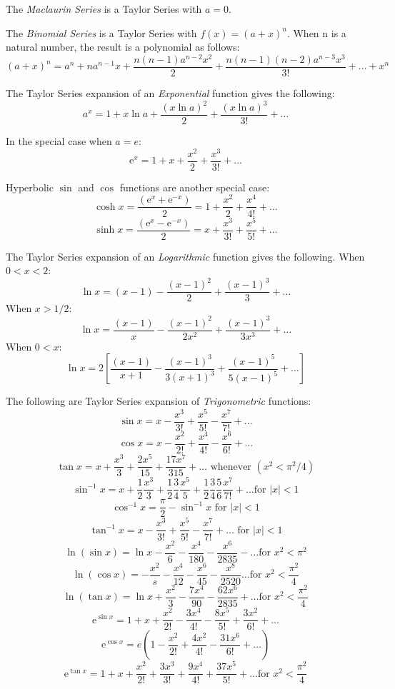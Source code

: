 \documentclass[
]{book}
\begin{document}
The \emph{Maclaurin Series} is a Taylor Series with \(a = 0\).

The \emph{Binomial Series} is a Taylor Series with \(f(x)=(a + x)^n\). When n is a natural number, the result is a polynomial as follows:
\[(a+x)^n = a^n + na^{n-1}x + \frac{n(n-1)a^{n-2}x^2}{2} + \frac{n(n-1)(n-2)a^{n-3}x^3}{3!} + \dots + x^n\]

The Taylor Series expansion of an \emph{Exponential} function gives the following:
\[a^x = 1 + x \ln a + \frac{(x \ln a)^2}{2} + \frac{(x \ln a)^3}{3!} + \dots\]

In the special case when \(a = e\):
\[\mathrm{e}^x = 1 + x + \frac{x^2}{2} + \frac{x^3}{3!}+ \dots\]

Hyperbolic \(\sin\) and \(\cos\) functions are another special case:
\[\cosh x = \frac{(\mathrm{e}^x + \mathrm{e}^{-x})}{2} = 1 + \frac{x^2}{2} + \frac{x^4}{4!}+ \dots\]
\[\sinh x = \frac{(\mathrm{e}^x - \mathrm{e}^{-x})}{2} = x + \frac{x^3}{3!} + \frac{x^5}{5!}+ \dots\]

The Taylor Series expansion of an \emph{Logarithmic} function gives the following. When \(0 < x < 2\):
\[\ln x = (x-1) - \frac{(x-1)^2}{2} + \frac{(x-1)^3}{3} + \dots\]
When \(x > 1/2\):
\[\ln x = \frac{(x-1)}{x} - \frac{(x-1)^2}{2x^2} + \frac{(x-1)^3}{3x^3} + \dots\]
When \(0 < x\):
\[\ln x = 2 \left[ \frac{(x-1)}{x+1} - \frac{(x-1)^3}{3(x+1)^3} + \frac{(x-1)^5}{5(x-1)^5} + \dots \right]\]

The following are Taylor Series expansion of \emph{Trigonometric} functions:
\[\sin x = x - \frac{x^3}{3!} + \frac{x^5}{5!} -\frac{x^7}{7!}+ \dots\]
\[\cos x = x - \frac{x^2}{2!} + \frac{x^4}{4!} -\frac{x^6}{6!}+ \dots\]
\[\tan x = x + \frac{x^3}{3} + \frac{2x^5}{15} + \frac{17x^7}{315}+ \dots \text{ whenever } (x^2 < \pi^2/4)\]
\[\sin^{-1} x = x + \frac{1}{2}\frac{x^3}{3} + \frac{1}{2}\frac{3}{4}\frac{x^5}{5} + \frac{1}{2}\frac{3}{4}\frac{5}{6}\frac{x^7}{7!} + \dots \text{for } |x|<1\]
\[\cos^{-1} x = \frac{\pi}{2} - \sin^{-1}x \text{ for } |x|<1\]
\[\tan^{-1} x = x - \frac{x^3}{3!} + \frac{x^5}{5!} -\frac{x^7}{7!} + \dots\text{ for } |x|<1\]
\[\ln(\sin x) = \ln x - \frac{x^2}{6} - \frac{x^4}{180} - \frac{x^6}{2835}- \dots \text{for } x^2 < \pi^2\]
\[\ln(\cos x) = - \frac{x^2}{s} - \frac{x^4}{12} - \frac{x^6}{45} - \frac{x^8}{2520} \dots \text{for } x^2 < \frac{\pi^2}{4}\]
\[\ln(\tan x) = \ln x + \frac{x^2}{3} - \frac{7x^4}{90} - \frac{62x^6}{2835}+ \dots \text{for } x^2 < \frac{\pi^2}{4}\]
\[\mathrm{e}^{\sin x} = 1 + x + \frac{x^2}{2!} - \frac{3x^4}{4!} -\frac{8x^5}{5!} + \frac{3x^2}{6!} + \dots\]
\[\mathrm{e}^{\cos x} = e \left(1 - \frac{x^2}{2!} +\frac{4x^2}{4!} - \frac{31x^6}{6!} + \dots \right)\]
\[\mathrm{e}^{\tan x} = 1 + x + \frac{x^2}{2!} + \frac{3x^3}{3!} + \frac{9x^4}{4!} + \frac{37x^5}{5!} + \dots \text{for } x^2 < \frac{\pi^2}{4}\]
\end{document}
